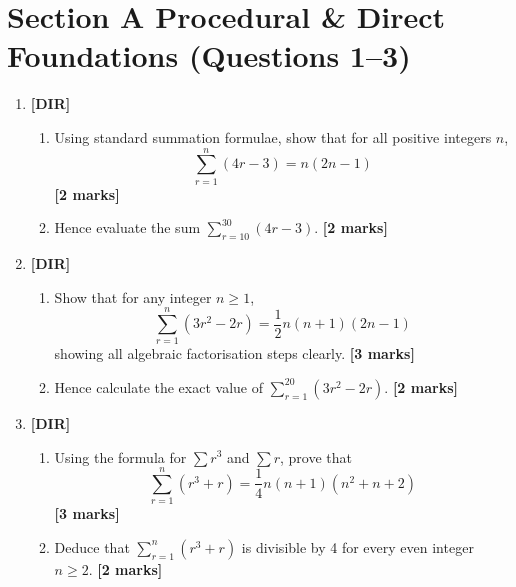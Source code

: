 \documentclass[11pt,a4paper]{article}
\begin{document}
\thispagestyle{plain}


\section*{Section A \quad Procedural \& Direct Foundations \hfill{\normalfont\footnotesize(Questions 1--3)}}
\begin{enumerate}

\item \textbf{[DIR]} 
\begin{enumerate}[label=(\alph*)]
  \item Using standard summation formulae, show that for all positive integers $n$,
  \[
  \sum_{r=1}^n (4r - 3) = n(2n - 1)
  \]
  \hfill{\textbf{[2 marks]}}
  \item Hence evaluate the sum $\displaystyle\sum_{r=10}^{30} (4r - 3)$. \hfill{\textbf{[2 marks]}}
\end{enumerate}

\item \textbf{[DIR]} 
\begin{enumerate}[label=(\alph*)]
  \item Show that for any integer $n \ge 1$,
  \[
  \sum_{r=1}^n (3r^2 - 2r) = \frac{1}{2}n(n+1)(2n - 1)
  \]
  showing all algebraic factorisation steps clearly. \hfill{\textbf{[3 marks]}}
  \item Hence calculate the exact value of $\displaystyle\sum_{r=1}^{20} (3r^2 - 2r)$. \hfill{\textbf{[2 marks]}}
\end{enumerate}

\item \textbf{[DIR]} 
\begin{enumerate}[label=(\alph*)]
  \item Using the formula for $\sum r^3$ and $\sum r$, prove that
  \[
  \sum_{r=1}^n (r^3 + r) = \frac{1}{4}n(n+1)(n^2 + n + 2)
  \]
  \hfill{\textbf{[3 marks]}}
  \item Deduce that $\sum_{r=1}^n (r^3 + r)$ is divisible by 4 for every even integer $n \ge 2$. \hfill{\textbf{[2 marks]}}
\end{enumerate}

\end{enumerate}
\end{document}
